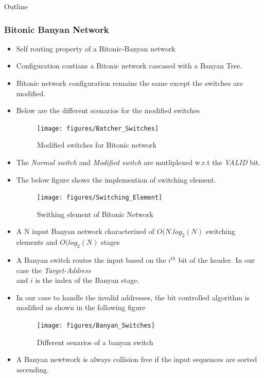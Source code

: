 \begin{frame}[allowframebreaks]{Outline}
\frametitle{Bitonic Banyan Network}
 \begin{itemize}
  \item Self routing property of a Bitonic-Banyan network \\
  \item Configuration contians a Bitonic network cascased with a Banyan Tree. \\
  \item Bitonic network configuration remains the same except the switches are modified. \\
  \item Below are the different scenarios for the modified switches\\
   \begin{figure}[!ht]
    \texttt{[image: figures/Batcher\_Switches]}
    \caption{Modified switches for Bitonic network }
  \end{figure}
  \item The \textit{Normal switch} and \textit{Modified switch} are mutliplexed w.r.t the \textit{VALID} bit.
  \item The below figure shows the implemention of switching element.
  \begin{figure}[!ht]
    \texttt{[image: figures/Switching\_Element]}
    \caption{Swithing element of Bitonic Network}
  \end{figure}
  \item A N input Banyan network characterized of $O( N.log_{2}(N)$ switching elements and $O(log_{2}(N)$ stages \\
  \item A Banyan switch routes the input based on the $i^{th}$ bit of the header. In our case the \textit{Target-Address} \\
  and  $i$ is the index of the Banyan stage.
  \item In our case to handle the invalid addresses, the bit controlled algorithm is modified as shown in the following figure \\
   \begin{figure}[!ht]
    \texttt{[image: figures/Banyan\_Switches]}
    \caption{ Different senarios of a banyan switch}
  \end{figure}
  \item  A Banyan newtwork is always collision free if the input sequences are sorted ascending.\\

\end{itemize}
\end{frame}
